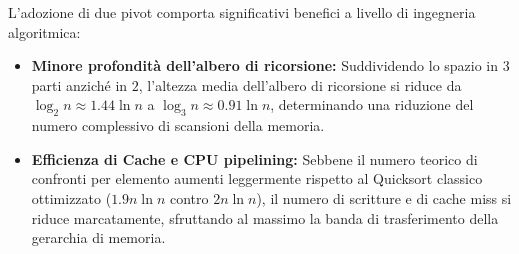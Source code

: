 \begin{table}[H]
  \centering
  \caption{Traccia puntuale passo-passo del partizionamento Dual-Pivot con pivot $P = 3$ e $Q = 7$. Al termine, i due pivot sono collocati nelle posizioni definitive (indici $2$ e $5$) e le chiamate ricorsive procedono separatamente sulle tre sotto-regioni.}
  \label{tab:dual-pivot-execution-trace}
\end{table}

\FloatBarrier

\begin{property}
L'adozione di due pivot comporta significativi benefici a livello di ingegneria algoritmica:
\begin{itemize}
  \item \textbf{Minore profondità dell'albero di ricorsione:} Suddividendo lo spazio in $3$ parti anziché in $2$, l'altezza media dell'albero di ricorsione si riduce da $\log_2 n \approx 1.44 \ln n$ a $\log_3 n \approx 0.91 \ln n$, determinando una riduzione del numero complessivo di scansioni della memoria.
  \item \textbf{Efficienza di Cache e CPU pipelining:} Sebbene il numero teorico di confronti per elemento aumenti leggermente rispetto al Quicksort classico ottimizzato ($1.9 n \ln n$ contro $2 n \ln n$), il numero di scritture e di cache miss si riduce marcatamente, sfruttando al massimo la banda di trasferimento della gerarchia di memoria.
\end{itemize}
\end{property}

